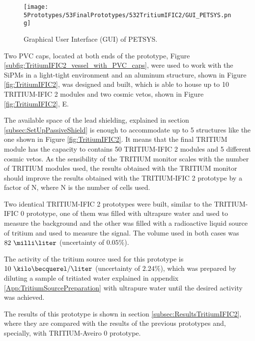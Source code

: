 \begin{figure}[h]
\centering
\texttt{[image: 5Prototypes/53FinalPrototypes/532TritiumIFIC2/GUI\_PETSYS.png]}
\caption{Graphical User Interface (GUI) of PETSYS.\label{fig:GUI_PETSYS}}
\end{figure}

Two PVC caps, located at both ends of the prototype, Figure \ref{subfig:TritiumIFIC2_vessel_with_PVC_caps}, were used to work with the SiPMs in a light-tight environment and an aluminum structure, shown in Figure \ref{fig:TritiumIFIC2}, was designed and built, which is able to house up to 10 TRITIUM-IFIC 2 modules and two cosmic vetos, shown in Figure \ref{fig:TritiumIFIC2}, E.

The available space of the lead shielding, explained in section \ref{subsec:SetUpPassiveShield} is enough to accommodate up to 5 structures like the one shown in Figure \ref{fig:TritiumIFIC2}. It means that the final TRITIUM module has the capacity to contains 50 TRITIUM-IFIC 2 modules and 5 different cosmic vetos. As the sensibility of the TRITIUM monitor scales with the number of TRITIUM modules used, the results obtained with the TRITIUM monitor should improve the results obtained with the TRITIUM-IFIC 2 prototype by a factor of N, where N is the number of cells used.

Two identical TRITIUM-IFIC 2 prototypes were built, similar to the TRITIUM-IFIC 0 prototype, one of them was filled with ultrapure water and used to measure the background and the other was filled with a radioactive liquid source of tritium and used to measure the signal. The volume used in both cases was $82~\milli\liter$ (uncertainty of $0.05\%$).

The activity of the tritium source used for this prototype is $10~\kilo\becquerel/\liter$ (uncertainty of $2.24\%$), which was prepared by diluting a sample of tritiated water explained in appendix \ref{App:TritiumSourcePreparation} with ultrapure water until the desired activity was achieved.

The results of this prototype is shown in section \ref{subsec:ResultsTritiumIFIC2}, where they are compared with the results of the previous prototypes and, specially, with TRITIUM-Aveiro 0 prototype.